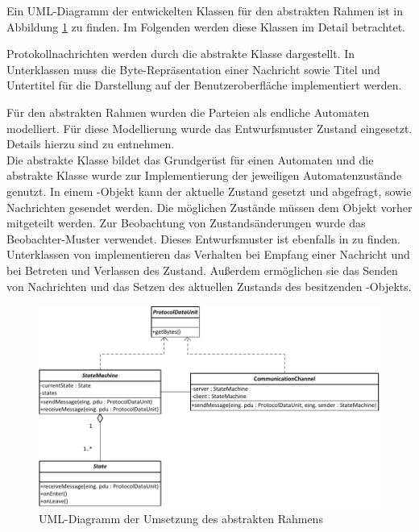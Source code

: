 Ein UML-Diagramm der entwickelten Klassen für den abstrakten Rahmen ist in Abbildung \ref{fig_uml_abstract_state_machine} zu finden. Im Folgenden werden diese Klassen im Detail betrachtet.

Protokollnachrichten werden durch die abstrakte Klasse  dargestellt. In Unterklassen muss die Byte-Repräsentation einer Nachricht sowie Titel und Untertitel für die Darstellung auf der Benutzeroberfläche implementiert werden.

Für den abstrakten Rahmen wurden die Parteien als endliche Automaten modelliert. Für diese Modellierung wurde das Entwurfsmuster Zustand eingesetzt. Details hierzu sind \cite{freeman04} zu entnehmen.\\
Die abstrakte Klasse  bildet das Grundgerüst für einen Automaten und die abstrakte Klasse  wurde zur Implementierung der jeweiligen Automatenzustände genutzt. In einem -Objekt kann der aktuelle Zustand gesetzt und abgefragt, sowie Nachrichten gesendet werden. Die möglichen Zustände müssen dem Objekt vorher mitgeteilt werden. Zur Beobachtung von Zustandsänderungen wurde das Beobachter-Muster verwendet. Dieses Entwurfsmuster ist ebenfalls in \cite{freeman04} zu finden.\\
Unterklassen von  implementieren das Verhalten bei Empfang einer Nachricht und bei Betreten und Verlassen des Zustand. Außerdem ermöglichen sie das Senden von Nachrichten und das Setzen des aktuellen Zustands des besitzenden -Objekts.

\begin{figure}
	\centering
	\includegraphics[scale=0.9]{Diagrams/uml/abstract_pdu_state_machine_channel.pdf} %
	\caption{UML-Diagramm der Umsetzung des abstrakten Rahmens}
	\label{fig_uml_abstract_state_machine}
\end{figure}

